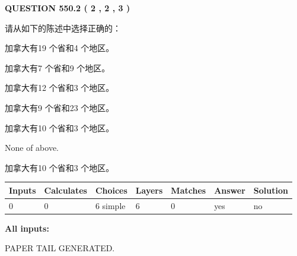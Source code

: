 \documentclass{ctexart}
\begin{document}
   
  
\vspace{0.2in}
  
{\textbf{\Large{QUESTION
550.2 
 ( 2 , 2 , 3 )
}}}
  
  
请从如下的陈述中选择正确的：
 
 
加拿大有19 个省和4 个地区。
 
 
加拿大有7 个省和9 个地区。
 
 
加拿大有12 个省和3 个地区。
 
 
加拿大有9 个省和23 个地区。
 
 
加拿大有10 个省和3 个地区。
 
 
 None of above.
 
 
\noindent{}
 
 
加拿大有10 个省和3 个地区。
 
 
\noindent{}
 
 
   
   
   
   
\noindent\begin{tabular}{|l|l|l|l|l|l|l|}
 \hline
Inputs & Calculates & Choices & Layers & Matches & Answer & Solution \\ \hline
 0  & 
 0  & 
 6
  simple  
  & 
 6  & 
 0  & 
  yes & 
  no 
  \\ \hline
 \end{tabular}
   
   
   
   
\noindent{}
   
   
   
   
\noindent\vspace{0.1in}\hspace{-0.08in} {\textbf{\Large{All inputs: }}}
   
   
   
   
   
   
 \vspace{0.2in}
 
   
   
\vspace{2.0in} PAPER TAIL GENERATED.
   
\end{document}
